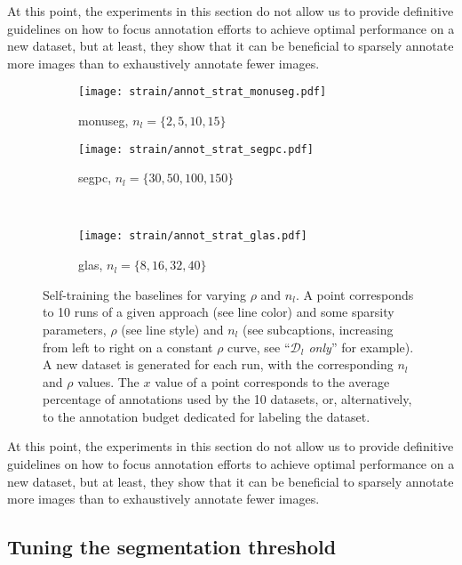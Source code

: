 At this point, the experiments in this section do not allow us to provide definitive guidelines on how to focus annotation efforts to achieve optimal performance on a new dataset, but at least, they show  that it can be beneficial to sparsely annotate more images than to exhaustively annotate fewer images.

\begin{figure}[t]
  \centering
  \begin{subfigure}{0.48\textwidth}
    \centering
    \texttt{[image: strain/annot\_strat\_monuseg.pdf]}
    \caption{\acrshort{monuseg}, $n_l = \{2, 5, 10, 15\}$ }
    \label{fig:strain:annot_strat_monuseg}
  \end{subfigure}
  \begin{subfigure}{0.48\textwidth}
    \centering
    \texttt{[image: strain/annot\_strat\_segpc.pdf]}
    \caption{\acrshort{segpc}, $n_l = \{30, 50, 100, 150\}$ }
    \label{fig:strain:annot_strat_segpc}
  \end{subfigure} \\
  \begin{subfigure}{0.48\textwidth}
    \centering
    \texttt{[image: strain/annot\_strat\_glas.pdf]}
    \caption{\acrshort{glas}, $n_l = \{8, 16, 32, 40\}$ }
    \label{fig:strain:annot_strat_glas}
  \end{subfigure}
  \caption{Self-training \vs the baselines for varying $\rho$ and $n_l$. A point corresponds to 10 runs of a given approach (see line color) and some sparsity parameters, $\rho$ (see line style) and $n_l$ (see subcaptions, increasing from left to right on a constant $\rho$ curve, see ``\textit{$\mathcal{D}_l$ only}'' for example). A new dataset is generated for each run, with the corresponding $n_l$ and $\rho$ values. The $x$ value of a point corresponds to the average percentage of annotations used by the 10 datasets, or, alternatively, to the annotation budget dedicated for labeling the dataset.}
  \label{fig:straing:annot_strat}
\end{figure}

At this point, the experiments in this section do not allow us to provide definitive guidelines on how to focus annotation efforts to achieve optimal performance on a new dataset, but at least, they show  that it can be beneficial to sparsely annotate more images than to exhaustively annotate fewer images.

\subsection{Tuning the segmentation threshold}\label{sec:straing:manualtuning}

